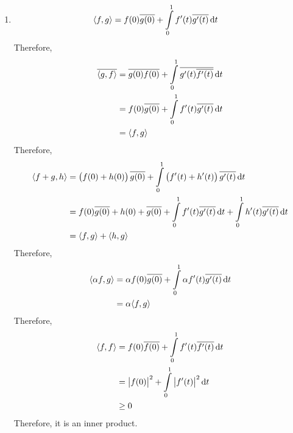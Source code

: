 \documentclass[fleqn, a4paper, 11pt, oneside]{amsart}
\theoremstyle{definition}
\theoremstyle{theorem}
\begin{document}
\begin{solution}
	\begin{enumerate}[leftmargin=*]
		\item
			\begin{align*}
				\langle f,g \rangle & = f(0) \overline{g(0)} + \int\limits_{0}^{1} f'(t) \overline{g'(t)} \dif t
			\end{align*}
			Therefore,
			\begin{align*}
				\overline{\langle g,f \rangle} & = \overline{g(0) f(0)} + \int\limits_{0}^{1} \overline{g'(t) \overline{f'(t)}} \dif t \\
                                                               & = f(0) \overline{g(0)} + \int\limits_{0}^{1} f'(t) \overline{g'(t)} \dif t            \\
                                                               & = \langle f,g \rangle
			\end{align*}
			Therefore,
			\begin{align*}
				\langle f + g , h \rangle & = \left( f(0) + h(0) \right) \overline{g(0)} + \int\limits_{0}^{1} \left( f'(t) + h'(t) \right) \overline{g'(t)} \dif t                                 \\
                                                          & = f(0) \overline{g(0)} + h(0) + \overline{g(0)} + \int\limits_{0}^{1} f'(t) \overline{g'(t)} \dif t + \int\limits_{0}^{1} h'(t) \overline{g'(t)} \dif t \\
                                                          & = \langle f,g \rangle + \langle h,g \rangle
			\end{align*}
			Therefore,
			\begin{align*}
				\langle \alpha f , g \rangle & = \alpha f(0) \overline{g(0)} + \int\limits_{0}^{1} \alpha f'(t) \overline{g'(t)} \dif t \\
                                                             & = \alpha \langle f,g \rangle
			\end{align*}
			Therefore,
			\begin{align*}
				\langle f,f \rangle & = f(0) \overline{f(0)} + \int\limits_{0}^{1} f'(t) \overline{f'(t)} \dif t  \\
                                                    & = \left| f(0) \right|^2 + \int\limits_{0}^{1} \left| f'(t) \right|^2 \dif t \\
                                                    & \ge 0
			\end{align*}
			Therefore, it is an inner product.

\end{enumerate}
\end{solution}
\end{document}
